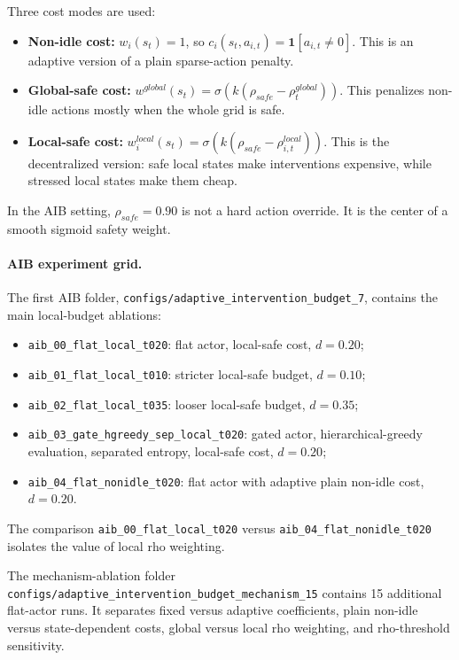Three cost modes are used:
\begin{itemize}
  \item \textbf{Non-idle cost:}
  \(w_i(s_t)=1\), so
  \(c_i(s_t,a_{i,t})=\mathbf{1}[a_{i,t}\neq0]\). This is an adaptive version
  of a plain sparse-action penalty.
  \item \textbf{Global-safe cost:}
  \(w^{global}(s_t)=\sigma(k(\rho_{safe}-\rho_t^{global}))\). This penalizes
  non-idle actions mostly when the whole grid is safe.
  \item \textbf{Local-safe cost:}
  \(w_i^{local}(s_t)=\sigma(k(\rho_{safe}-\rho_{i,t}^{local}))\). This is the
  decentralized version: safe local states make interventions expensive, while
  stressed local states make them cheap.
\end{itemize}
In the AIB setting, \(\rho_{safe}=0.90\) is not a hard action override. It is
the center of a smooth sigmoid safety weight.

\paragraph{AIB experiment grid.}
The first AIB folder, \texttt{configs/adaptive\_intervention\_budget\_7},
contains the main local-budget ablations:
\begin{itemize}
  \item \texttt{aib\_00\_flat\_local\_t020}: flat actor, local-safe cost,
  \(d=0.20\);
  \item \texttt{aib\_01\_flat\_local\_t010}: stricter local-safe budget,
  \(d=0.10\);
  \item \texttt{aib\_02\_flat\_local\_t035}: looser local-safe budget,
  \(d=0.35\);
  \item \texttt{aib\_03\_gate\_hgreedy\_sep\_local\_t020}: gated actor,
  hierarchical-greedy evaluation, separated entropy, local-safe cost,
  \(d=0.20\);
  \item \texttt{aib\_04\_flat\_nonidle\_t020}: flat actor with adaptive plain
  non-idle cost, \(d=0.20\).
\end{itemize}
The comparison \texttt{aib\_00\_flat\_local\_t020} versus
\texttt{aib\_04\_flat\_nonidle\_t020} isolates the value of local rho weighting.

The mechanism-ablation folder
\texttt{configs/adaptive\_intervention\_budget\_mechanism\_15} contains 15
additional flat-actor runs. It separates fixed versus adaptive coefficients,
plain non-idle versus state-dependent costs, global versus local rho weighting,
and rho-threshold sensitivity.

